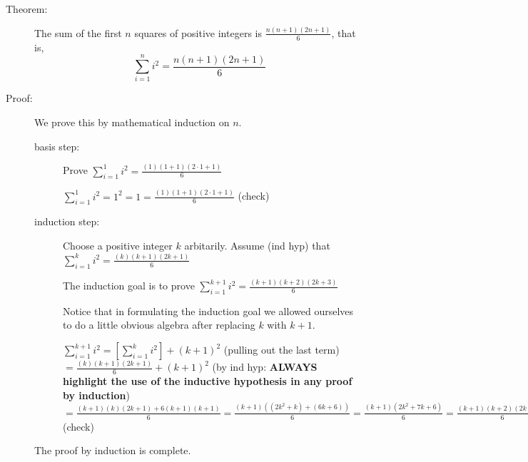 \documentclass[12pt]{article}
\begin{document}
\begin{description}
\item[Theorem:]  The sum of the first $n$ squares of positive integers is $\frac{n(n+1)(2n+1)}6$, that is, $$\sum_{i=1}^ni^2 =\frac{n(n+1)(2n+1)}6$$

\item[Proof:]

We prove this by mathematical induction on $n$.

\begin{description}

\item[basis step:]  Prove $\sum_{i=1}^1i^2 = \frac{(1)(1+1)(2\cdot 1+1)}6$

$\sum_{i=1}^1i^2 = 1^2=1= \frac{(1)(1+1)(2\cdot 1+1)}6$ (check)

\item[induction step:]  Choose a positive integer $k$ arbitarily.\newline
Assume (ind hyp) that $\sum_{i=1}^ki^2 = \frac{(k)(k+1)(2k+1)}6$

The induction goal is to prove  $\sum_{i=1}^{k+1}i^2 = \frac{(k+1)(k+2)(2k+3)}6$

Notice that in formulating the induction goal we allowed ourselves to do a little obvious algebra after replacing $k$ with $k+1$.

$\sum_{i=1}^{k+1}i^2  = [\sum_{i=1}^{k}i^2 ]+ (k+1)^2$ (pulling out the last term) $= \frac{(k)(k+1)(2k+1)}6+(k+1)^2$ (by ind hyp: {\bf ALWAYS highlight the use of the inductive hypothesis in any proof by induction}) $= \frac{(k+1)(k)(2k+1) + 6(k+1)(k+1)}6 = \frac{(k+1)((2k^2+k)+(6k+6))}6 = \frac {(k+1)(2k^2+7k+6)}6 = \frac {(k+1)(k+2)(2k+3))}6$ (check)                                                                                                                                                                                                                                                                                                                                                                                                                                                                                                                                                                    


\end{description}

The proof by induction is complete.

\end{description}
\end{document}
